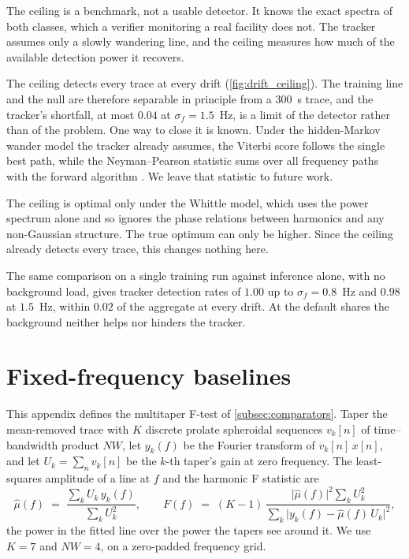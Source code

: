 \documentclass{article}
\begin{document}
The ceiling is a benchmark, not a usable detector. It knows the exact spectra of
both classes, which a verifier monitoring a real facility does not. The tracker
assumes only a slowly wandering line, and the ceiling measures how much of the
available detection power it recovers.

The ceiling detects every trace at every drift (\cref{fig:drift_ceiling}). The
training line and the null are therefore separable in principle from a
$300$~s trace, and the tracker's shortfall, at most $0.04$ at
$\sigma_f = 1.5$~Hz, is a limit of the detector rather than of the problem. One
way to close it is known. Under the hidden-Markov wander model the tracker
already assumes, the Viterbi score follows the single best path, while the
Neyman--Pearson statistic sums over all frequency paths with the forward
algorithm \citep{streit1990frequency}. We leave that statistic to future work.

The ceiling is optimal only under the Whittle model, which uses the power
spectrum alone and so ignores the phase relations between harmonics and any
non-Gaussian structure. The true optimum can only be higher. Since the ceiling
already detects every trace, this changes nothing here.

The same comparison on a single training run
against inference alone, with no background load, gives tracker detection rates
of $1.00$ up to $\sigma_f = 0.8$~Hz and $0.98$ at $1.5$~Hz, within $0.02$ of
the aggregate at every drift. At the default shares the background neither helps nor hinders the
tracker.

\section{Fixed-frequency baselines}
\label{app:baselines}

This appendix defines the multitaper F-test of \cref{subsec:comparators}. Taper
the mean-removed trace with $K$ discrete prolate spheroidal sequences $v_k[n]$
of time--bandwidth product $NW$, let $y_k(f)$ be the Fourier transform of
$v_k[n]\,x[n]$, and let $U_k = \sum_n v_k[n]$ be the $k$-th taper's gain at
zero frequency. The least-squares amplitude of a line at $f$ and the harmonic F
statistic are \citep{thomson1982multitaper, percival1993spectral}
\begin{equation}
	\hat\mu(f) \;=\; \frac{\sum_k U_k\, y_k(f)}{\sum_k U_k^2},
	\qquad
	F(f) \;=\; (K-1)\,
	\frac{\lvert\hat\mu(f)\rvert^2 \sum_k U_k^2}
	{\sum_k \bigl\lvert y_k(f) - \hat\mu(f)\,U_k \bigr\rvert^2},
	\label{eq:thomson_f}
\end{equation}
the power in the fitted line over the power the tapers see around it. We use
$K = 7$ and $NW = 4$, on a zero-padded frequency grid.
\end{document}
